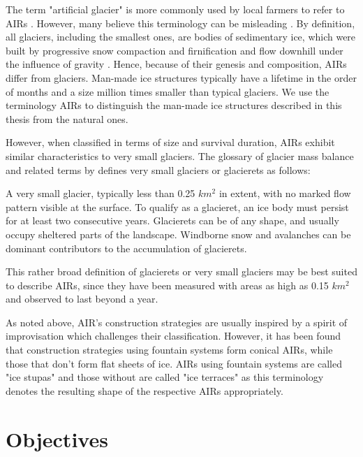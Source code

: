 The term "artificial glacier" is more commonly used by local farmers to refer to \ac{AIRs}
\citep{norphelArtificialGlacierHigh2009}. However, many believe this terminology can be misleading
\citep{nusserSociohydrologyArtificialGlaciers2019}. By definition, all glaciers, including the smallest ones,
are bodies of sedimentary ice, which were built by progressive snow compaction and firnification and flow
downhill under the influence of gravity \citep{benndouglasGlaciersGlaciation2014}. Hence, because of their
genesis and composition, \ac{AIRs} differ from glaciers. Man-made ice structures typically have a lifetime in
the order of months and a size million times smaller than typical glaciers. We use the terminology \ac{AIRs} to
distinguish the man-made ice structures described in this thesis from the natural ones. 

However, when classified in terms of size and survival duration, \ac{AIRs} exhibit similar characteristics to
very small glaciers. The glossary of glacier mass balance and related terms by
\citet{cogleyGlossaryGlacierMass2010} defines very small glaciers or glacierets as follows:

\begin{thesis_quotation}
  A very small glacier, typically less than 0.25 $km^2$ in extent, with no marked flow pattern
  visible at the surface. To qualify as a glacieret, an ice body must persist for at least two consecutive
  years. Glacierets can be of any shape, and usually occupy sheltered parts of the landscape. Windborne snow and
  avalanches can be dominant contributors to the accumulation of glacierets.
\end{thesis_quotation}

This rather broad definition of glacierets or very small glaciers may be best suited to describe AIRs, since
they have been measured with areas as high as 0.15 $km^2$ \citep{nusserSociohydrologyArtificialGlaciers2019} and
observed to last beyond a year.

As noted above, AIR's construction strategies are usually inspired by a spirit of improvisation which challenges
their classification. However, it has been found that construction strategies using fountain systems form
conical \ac{AIRs}, while those that don't form flat sheets of ice. \ac{AIRs} using fountain systems are called
"ice stupas" and those without are called "ice terraces" as this terminology denotes the resulting shape of the
respective \ac{AIRs} appropriately.

\section{Objectives}

